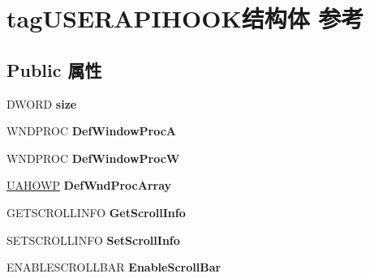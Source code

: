 \hypertarget{structtag_u_s_e_r_a_p_i_h_o_o_k}{}\section{tag\+U\+S\+E\+R\+A\+P\+I\+H\+O\+O\+K结构体 参考}
\label{structtag_u_s_e_r_a_p_i_h_o_o_k}
\subsection*{Public 属性}
\begin{DoxyCompactItemize}
\item 
\mbox{\label{structtag_u_s_e_r_a_p_i_h_o_o_k_a4bfa39cf24541b71eefc6e11070367a5}} 
D\+W\+O\+RD {\bfseries size}
\item 
\mbox{\label{structtag_u_s_e_r_a_p_i_h_o_o_k_ab018b6066dca7314bc7a632577d6b505}} 
W\+N\+D\+P\+R\+OC {\bfseries Def\+Window\+ProcA}
\item 
\mbox{\label{structtag_u_s_e_r_a_p_i_h_o_o_k_ad33a0430f3cd2dd5e8c491d16e4a5fc6}} 
W\+N\+D\+P\+R\+OC {\bfseries Def\+Window\+ProcW}
\item 
\mbox{\label{structtag_u_s_e_r_a_p_i_h_o_o_k_aa5785f7eb98b51f55e04babbfab44530}} 
\hyperlink{struct___u_a_h_o_w_p}{U\+A\+H\+O\+WP} {\bfseries Def\+Wnd\+Proc\+Array}
\item 
\mbox{\label{structtag_u_s_e_r_a_p_i_h_o_o_k_a61da931f550ba6359497282368c4486a}} 
G\+E\+T\+S\+C\+R\+O\+L\+L\+I\+N\+FO {\bfseries Get\+Scroll\+Info}
\item 
\mbox{\label{structtag_u_s_e_r_a_p_i_h_o_o_k_af580b3752bf174be78e23fbb47ef4ebb}} 
S\+E\+T\+S\+C\+R\+O\+L\+L\+I\+N\+FO {\bfseries Set\+Scroll\+Info}
\item 
\mbox{\label{structtag_u_s_e_r_a_p_i_h_o_o_k_ac140c7de4d7a68d5e4652f36b414dcbf}} 
E\+N\+A\+B\+L\+E\+S\+C\+R\+O\+L\+L\+B\+AR {\bfseries Enable\+Scroll\+Bar}
\item 
\mbox{\label{structtag_u_s_e_r_a_p_i_h_o_o_k_aaba2578dcd0214317551780bbd5ead2c}} 

\end{DoxyCompactItemize}
